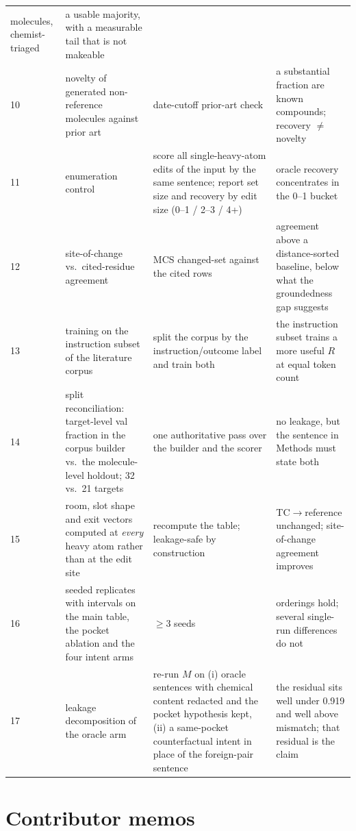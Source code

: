 \begin{table}[H]
\begin{tabular}{p{0.5cm}p{4.6cm}p{4.2cm}p{5.2cm}}
molecules, chemist-triaged & a usable majority, with a measurable tail that is not makeable \\
10 & novelty of generated non-reference molecules against prior art & date-cutoff prior-art check &
a substantial fraction are known compounds; recovery $\neq$ novelty \\
11 & enumeration control & score all single-heavy-atom edits of the input by the same sentence;
report set size and recovery by edit size (0--1 / 2--3 / 4+) & oracle recovery concentrates in the
0--1 bucket \\
12 & site-of-change vs.\ cited-residue agreement & MCS changed-set against the cited rows &
agreement above a distance-sorted baseline, below what the groundedness gap suggests \\
13 & training on the instruction subset of the literature corpus & split the corpus by the
instruction/outcome label and train both & the instruction subset trains a more useful $R$ at equal
token count \\
14 & split reconciliation: target-level val fraction in the corpus builder vs.\ the molecule-level
holdout; 32 vs.\ 21 targets & one authoritative pass over the builder and the scorer & no leakage,
but the sentence in Methods must state both \\
15 & room, slot shape and exit vectors computed at \emph{every} heavy atom rather than at the edit
site & recompute the table; leakage-safe by construction & TC$\rightarrow$reference unchanged;
site-of-change agreement improves \\
16 & seeded replicates with intervals on the main table, the pocket ablation and the four intent arms
& $\geq$3 seeds & orderings hold; several single-run differences do not \\
17 & leakage decomposition of the oracle arm & re-run $M$ on (i) oracle sentences with chemical
content redacted and the pocket hypothesis kept, (ii) a same-pocket counterfactual intent in place
of the foreign-pair sentence & the residual sits well under 0.919 and well above mismatch; that
residual is the claim \\
\bottomrule
\end{tabular}
\end{table}

\section{Contributor memos}

